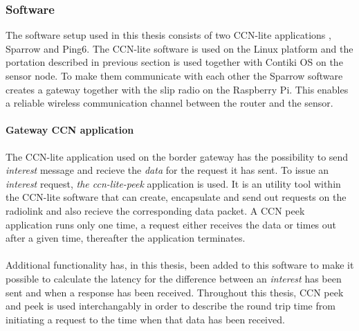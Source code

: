 \subsubsection{Software}
The software setup used in this thesis consists of two CCN-lite applications \cite{CCN-LITE} \cite{yanqui}, Sparrow \cite{Sparrow} and Ping6. The CCN-lite software is used on the Linux platform and the portation described in previous section is used together with Contiki OS on the sensor node. To make them communicate with each other the Sparrow software creates a gateway together with the slip radio on the Raspberry Pi. This enables a reliable wireless communication channel between the router and the sensor.

\paragraph{Gateway CCN application}
The CCN-lite application used on the border gateway has the possibility to send \textit{interest} message and recieve the \textit{data} for the request it has sent. To issue an \textit{interest} request, \textit{the ccn-lite-peek} application is used. It is an utility tool within the CCN-lite software that can create, encapsulate and send out requests on the radiolink and also recieve the corresponding data packet. A CCN peek application runs only one time, a request either receives the data or times out after a given time, thereafter the application terminates.\\\\
Additional functionality has, in this thesis, been added to this software to make it possible to calculate the latency for the difference between an \textit{interest} has been sent and when a response has been received. Throughout this thesis, CCN peek and peek is used interchangably in order to describe the round trip time from initiating a request to the time when that data has been received. 

